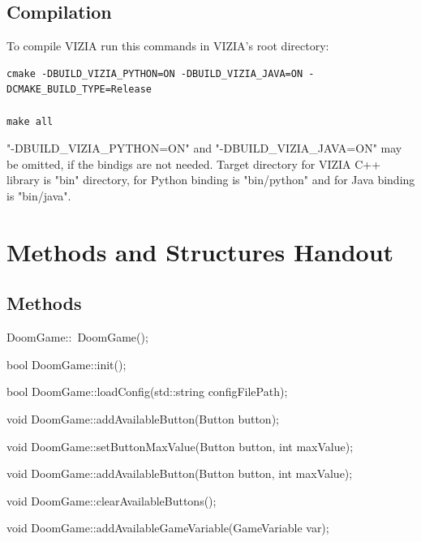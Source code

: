 \documentclass[english,bachelor,a4paper,twoside]{ppfcmthesis}
\begin{document}
\section{Compilation}
To compile VIZIA run this commands in VIZIA's root directory:
	\begin{lstlisting}
cmake -DBUILD_VIZIA_PYTHON=ON -DBUILD_VIZIA_JAVA=ON -DCMAKE_BUILD_TYPE=Release

make all
    \end{lstlisting}

"-DBUILD\_VIZIA\_PYTHON=ON" and "-DBUILD\_VIZIA\_JAVA=ON" may be omitted, if the bindigs are not needed.
Target directory for VIZIA C++ library is "bin" directory, for Python binding is "bin/python" and for Java binding is "bin/java".

\chapter{Methods and Structures Handout}
\section{Methods}


\begin{clinee}
DoomGame::~DoomGame();
\end{clinee}


\begin{clinee}
bool DoomGame::init();
\end{clinee}


\begin{clinee}
bool DoomGame::loadConfig(std::string configFilePath);
\end{clinee}


\begin{clinee}
void DoomGame::addAvailableButton(Button button);
\end{clinee}

\begin{clinee}
void DoomGame::setButtonMaxValue(Button button, int maxValue);
\end{clinee}


\begin{clinee}
void DoomGame::addAvailableButton(Button button, int maxValue);
\end{clinee}


\begin{clinee}
void DoomGame::clearAvailableButtons();
\end{clinee}


\begin{clinee}
void DoomGame::addAvailableGameVariable(GameVariable var);
\end{clinee}
\end{document}
